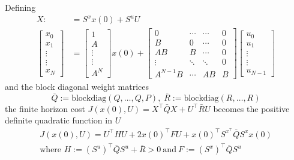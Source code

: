 \newpar{}

Defining
\begin{align*}
    X:              & =S^x x(0)+S^u U \\
    \begin{bmatrix}
        x_0    \\
        x_1    \\
        \vdots \\
        \vdots \\
        x_N
    \end{bmatrix} & =
    \begin{bmatrix}
        1      \\
        A      \\
        \vdots \\
        \vdots \\
        A^N
    \end{bmatrix}x(0)+
    \begin{bmatrix}
        0        & \cdots & \cdots & 0 \\
        B        & 0      & \cdots & 0 \\
        AB       & B      & \cdots & 0 \\
        \vdots   & \ddots & \ddots & 0 \\
        A^{N-1}B & \cdots & AB     & B
    \end{bmatrix}
    \begin{bmatrix}
        u_0    \\
        u_1    \\
        \vdots \\
        \vdots \\
        u_{N-1}
    \end{bmatrix}
\end{align*}
and the block diagonal weight matrices
\begin{equation*}
    \overline{Q}:=\mathrm{blockdiag}(Q,\dots,Q,P),\; \overline{R}:=\mathrm{blockdiag}(R,\dots,R)
\end{equation*}
the finite horizon cost $J(x(0), U) = X^{\top}\bar{Q}X + U^{\top}\bar{R}U$ becomes the positive definite quadratic function in $U$
\begin{gather*}
    J(x(0), U) =U^{\top}HU+2{x(0)}^{\top}FU+{x(0)}^{\top}S^{x^{\top}}\overline{Q}S^{x}x(0)\\
    \text{where } H:={(S^u)}^\top\overline{Q} S^u+\overline{R} > 0 \mathrm{~and~}F:={(S^x)}^\top\overline{Q} S^u
\end{gather*}

